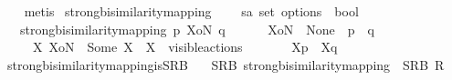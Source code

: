 \begin{isabellebody}
\ \ \isamarkupfalse%
\ metis%
\endisatagproof
{\isafoldproof}%
%
\isadelimproof
%
\endisadelimproof
%
\isadelimdocument
%
\endisadelimdocument
%
\isatagdocument
%
\isamarkuptrue%
%
\endisatagdocument
{\isafolddocument}%
%
\isadelimdocument
%
\endisadelimdocument
{}\isamarkupfalse%
\ strong{\isacharunderscore}{\kern0pt}bisimilarity{\isacharunderscore}{\kern0pt}mapping\ %
\isanewline
\ \ {\isacharcolon}{\kern0pt}{\isacharcolon}{\kern0pt}\ {\isacartoucheopen}{\isacharprime}{\kern0pt}s{\isasymRightarrow}{\isacharprime}{\kern0pt}a\ set\ option{\isasymRightarrow}{\isacharprime}{\kern0pt}s\ {\isasymRightarrow}\ bool{\isacartoucheclose}\isanewline
\ \ \ {\isacartoucheopen}{\isacharparenleft}{\kern0pt}strong{\isacharunderscore}{\kern0pt}bisimilarity{\isacharunderscore}{\kern0pt}mapping{\isacharparenright}{\kern0pt}\ p\ XoN\ q\ \isanewline
\ \ \ \ {\isasymequiv}\ {\isacharparenleft}{\kern0pt}XoN\ {\isacharequal}{\kern0pt}\ None\ {\isasymand}\ {\isacharparenleft}{\kern0pt}{\isasymtheta}{\isacharparenleft}{\kern0pt}p{\isacharparenright}{\kern0pt}{\isacharparenright}{\kern0pt}\ {\isasymleftrightarrow}\ {\isacharparenleft}{\kern0pt}{\isasymtheta}{\isacharparenleft}{\kern0pt}q{\isacharparenright}{\kern0pt}{\isacharparenright}{\kern0pt}{\isacharparenright}{\kern0pt}\ {\isasymor}\isanewline
\ \ \ \ {\isacharparenleft}{\kern0pt}{\isasymexists}\ X{\isachardot}{\kern0pt}\ XoN\ {\isacharequal}{\kern0pt}\ Some\ X\ {\isasymand}\ X\ {\isasymsubseteq}\ visible{\isacharunderscore}{\kern0pt}actions\ {\isasymand}\ \isanewline
\ \ \ \ \ {\isasymtheta}{\isacharbrackleft}{\kern0pt}X{\isacharbrackright}{\kern0pt}{\isacharparenleft}{\kern0pt}p{\isacharparenright}{\kern0pt}\ {\isasymleftrightarrow}\ {\isasymtheta}{\isacharbrackleft}{\kern0pt}X{\isacharbrackright}{\kern0pt}{\isacharparenleft}{\kern0pt}q{\isacharparenright}{\kern0pt}{\isacharparenright}{\kern0pt}{\isacartoucheclose}\isanewline
\isanewline
{}\isamarkupfalse%
\ strong{\isacharunderscore}{\kern0pt}bisimilarity{\isacharunderscore}{\kern0pt}mapping{\isacharunderscore}{\kern0pt}is{\isacharunderscore}{\kern0pt}SRB{\isacharcolon}{\kern0pt}\isanewline
\ \ \ {\isacartoucheopen}SRB\ strong{\isacharunderscore}{\kern0pt}bisimilarity{\isacharunderscore}{\kern0pt}mapping{\isacartoucheclose}\ {\isacharparenleft}{\kern0pt}\ {\isacartoucheopen}SRB\ {\isacharquery}{\kern0pt}R{\isacartoucheclose}{\isacharparenright}{\kern0pt}\isanewline

\end{isabellebody}
